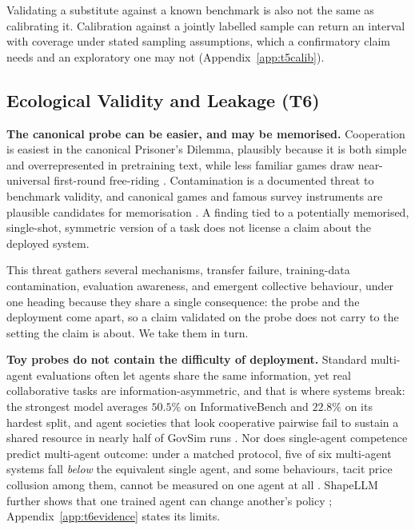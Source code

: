 \documentclass[11pt]{article}
\begin{document}
Validating a substitute against a known benchmark is also not the same as
calibrating it. Calibration against a jointly labelled sample can return an
interval with coverage under stated sampling assumptions, which a confirmatory
claim needs and an exploratory one may not
\cite{hullman2025human,angelopoulos2023ppi} (Appendix~\ref{app:t5calib}).

\subsection{Ecological Validity and Leakage (T6)}

\textbf{The canonical probe can be easier, and may be memorised.}
Cooperation is easiest in the canonical Prisoner's Dilemma, plausibly because it is
both simple and overrepresented in pretraining text, while less familiar games draw
near-universal first-round free-riding \cite{tewolde2026coopeval}. Contamination is
a documented threat to benchmark validity, and canonical games and famous survey
instruments are plausible candidates for memorisation
\cite{sainz2023nlp,oren2024proving,dekoninck2024constat,zhang2024pacost}. A finding
tied to a potentially memorised, single-shot, symmetric version of a task does not license a
claim about the deployed system.

\label{sec:t6}

This threat gathers several mechanisms, transfer failure, training-data
contamination, evaluation awareness, and emergent collective behaviour, under
one heading because they share a single consequence: the probe and the
deployment come apart, so a claim validated on the probe does not carry to the
setting the claim is about. We take them in turn.

\textbf{Toy probes do not contain the difficulty of deployment.} Standard
multi-agent evaluations often let agents share the same information, yet real
collaborative tasks are information-asymmetric, and that is where systems break:
the strongest model averages $50.5\%$ on InformativeBench and $22.8\%$ on its
hardest split, and agent societies that look cooperative pairwise fail to sustain
a shared resource in nearly half of GovSim runs
\cite{liu2024autonomous,piatti2024govsim,liu2025machines}. Nor does single-agent
competence predict multi-agent outcome: under a matched protocol, five of six
multi-agent systems fall \emph{below} the equivalent single agent, and some
behaviours, tacit price collusion among them, cannot be measured on one agent at
all \cite{fu2026moreagents,tang2025taskcomplexity,cemri2025mast,%
agrawal2025collusion,tian2026promptcollusion,motwani2024collusion}.
ShapeLLM further shows that one trained agent can change another's policy
\cite{segura2025opponentshaping}; Appendix~\ref{app:t6evidence} states its limits.
\end{document}
